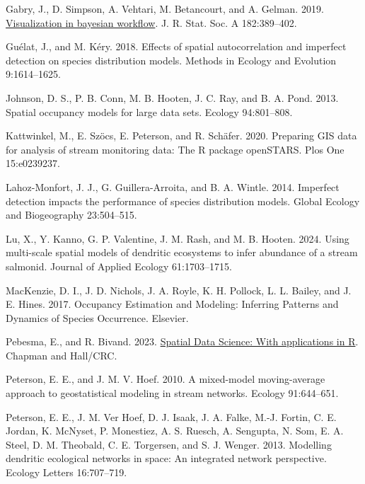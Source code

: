 \documentclass[
  11pt,
  a4paper,
]{article}
\newlength{\cslhangindent}
\newenvironment{CSLReferences}[2] %
 {\begin{list}{}{%
  \setlength{\itemindent}{0pt}
  \setlength{\leftmargin}{0pt}
  \setlength{\parsep}{0pt}
  \ifodd #1
   \setlength{\leftmargin}{\cslhangindent}
   \setlength{\itemindent}{-1\cslhangindent}
  \fi
  \setlength{\itemsep}{#2\baselineskip}}}
 {\end{list}}
\begin{document}
\begin{CSLReferences}{1}{0}
Gabry, J., D. Simpson, A. Vehtari, M. Betancourt, and A. Gelman. 2019. \href{https://doi.org/10.1111/rssa.12378}{Visualization in bayesian workflow}. J. R. Stat. Soc. A 182:389--402.

Guélat, J., and M. Kéry. 2018. Effects of spatial autocorrelation and imperfect detection on species distribution models. Methods in Ecology and Evolution 9:1614--1625.

Johnson, D. S., P. B. Conn, M. B. Hooten, J. C. Ray, and B. A. Pond. 2013. Spatial occupancy models for large data sets. Ecology 94:801--808.

Kattwinkel, M., E. Szöcs, E. Peterson, and R. Schäfer. 2020. Preparing GIS data for analysis of stream monitoring data: The {R} package openSTARS. Plos One 15:e0239237.

Lahoz-Monfort, J. J., G. Guillera-Arroita, and B. A. Wintle. 2014. Imperfect detection impacts the performance of species distribution models. Global Ecology and Biogeography 23:504--515.

Lu, X., Y. Kanno, G. P. Valentine, J. M. Rash, and M. B. Hooten. 2024. Using multi-scale spatial models of dendritic ecosystems to infer abundance of a stream salmonid. Journal of Applied Ecology 61:1703--1715.

MacKenzie, D. I., J. D. Nichols, J. A. Royle, K. H. Pollock, L. L. Bailey, and J. E. Hines. 2017. Occupancy {Estimation} and {Modeling}: {Inferring Patterns} and {Dynamics} of {Species Occurrence}. {Elsevier}.

Pebesma, E., and R. Bivand. 2023. \href{https://doi.org/10.1201/9780429459016}{{Spatial Data Science: With applications in R}}. {Chapman and Hall/CRC}.

Peterson, E. E., and J. M. V. Hoef. 2010. A mixed-model moving-average approach to geostatistical modeling in stream networks. Ecology 91:644--651.

Peterson, E. E., J. M. Ver Hoef, D. J. Isaak, J. A. Falke, M.-J. Fortin, C. E. Jordan, K. McNyset, P. Monestiez, A. S. Ruesch, A. Sengupta, N. Som, E. A. Steel, D. M. Theobald, C. E. Torgersen, and S. J. Wenger. 2013. Modelling dendritic ecological networks in space: An integrated network perspective. Ecology Letters 16:707--719.


\end{CSLReferences}
\end{document}
